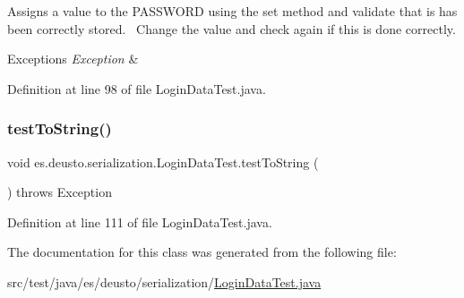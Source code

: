 Assigns a value to the P\+A\+S\+S\+W\+O\+RD using the set method and validate that is has been correctly stored.~\newline
Change the value and check again if this is done correctly. 
\begin{DoxyExceptions}{Exceptions}
{\em Exception} & \\
\hline
\end{DoxyExceptions}


Definition at line 98 of file Login\+Data\+Test.\+java.

\mbox{\label{classes_1_1deusto_1_1serialization_1_1_login_data_test_a3eae0dd2b793998614e5d6ac75c694ed}} 
\subsubsection{\texorpdfstring{test\+To\+String()}{testToString()}}
{\footnotesize\ttfamily void es.\+deusto.\+serialization.\+Login\+Data\+Test.\+test\+To\+String (\begin{DoxyParamCaption}{ }\end{DoxyParamCaption}) throws Exception}



Definition at line 111 of file Login\+Data\+Test.\+java.



The documentation for this class was generated from the following file\+:\begin{DoxyCompactItemize}
\item 
src/test/java/es/deusto/serialization/\hyperlink{_login_data_test_8java}{Login\+Data\+Test.\+java}\end{DoxyCompactItemize}
